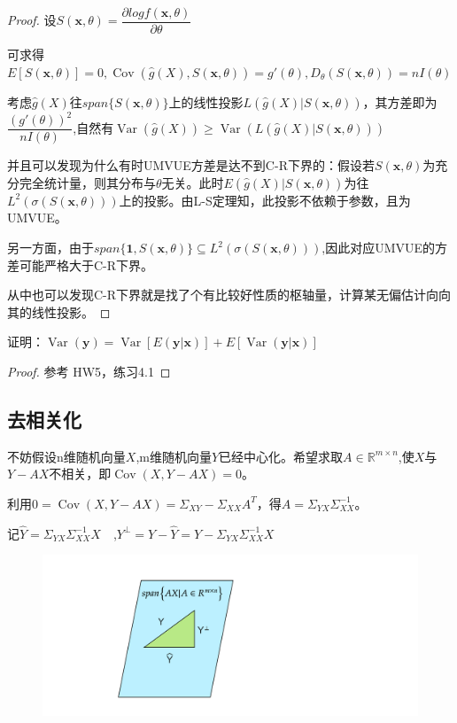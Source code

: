 \documentclass[cn,hazy,green,12pt,normal]{elegantnote}
\DeclareMathOperator{\Cov}{Cov}
\DeclareMathOperator{\Var}{Var}
\newcommand{\p}{\partial}
\newcommand{\MR}{\mathbb R}
\numberwithin{equation}{section}
\numberwithin{subsection}{section}
\begin{document}
\begin{proof}
    设$S(\bm x,\theta)=\dfrac{\p log f(\bm x,\theta)}{\p \theta}$
    
    可求得$E[S(\bm x,\theta)]=0,\Cov(\hat{g}(X),S(\bm x,\theta))=g'(\theta), D_{\theta}(S(\bm x,\theta))=nI(\theta)$

    考虑$\hat{g}(X)$往$span\{S(\bm x,\theta)\}$上的线性投影$L(\hat{g}(X)|S(\bm x,\theta))$，其方差即为$\dfrac{(g'(\theta ))^2}{nI(\theta)}$,自然有$\Var(\hat{g}(X))\ge \Var(L(\hat{g}(X)|S(\bm x,\theta)))$

    并且可以发现为什么有时UMVUE方差是达不到C-R下界的：假设若$S(\bm x,\theta)$为充分完全统计量，则其分布与$\theta$无关。此时$E(\hat{g}(X)|S(\bm x,\theta))$为往$L^2(\sigma(S(\bm x, \theta)))$上的投影。由L-S定理知，此投影不依赖于参数，且为UMVUE。
    
    另一方面，由于$span\{\bm 1, S(\bm x, \theta)\} \subseteq L^2(\sigma(S(\bm x, \theta)))$,因此对应UMVUE的方差可能严格大于C-R下界。

    从中也可以发现C-R下界就是找了个有比较好性质的枢轴量，计算某无偏估计向向其的线性投影。
\end{proof}

\begin{example}
    证明：$\Var(\bm y)=\Var[E(\bm y|\bm x)]+E[\Var(\bm y|\bm x)]$
\end{example}
\begin{proof}
    参考\cite{cn3} HW5，练习4.1
\end{proof}
\subsection{去相关化}\label{decorrelation}
不妨假设n维随机向量$X$,m维随机向量$Y$已经中心化。希望求取$A\in \MR^{m\times n}$,使$X$与$Y-AX$不相关，即$\Cov(X,Y-AX)=0$。

利用$0=\Cov(X,Y-AX)=\Sigma_{XY}-\Sigma_{XX}A^T$，得$A=\Sigma_{YX}\Sigma_{XX}^{-1}$。

记$\hat{Y}=\Sigma_{YX}\Sigma_{XX}^{-1}X\quad$,$Y^{\perp}=Y-\hat{Y}=Y-\Sigma_{YX}\Sigma_{XX}^{-1}X$

\begin{figure}[!htbp]
    \centering
    \includegraphics[width=40em]{image/image_2.png}
    \label{image_2}
\end{figure}
\end{document}
